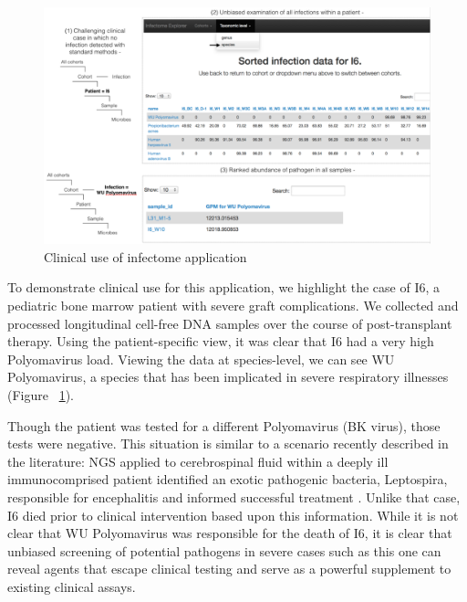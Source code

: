 \begin{figure}
\center\includegraphics[width=150mm,scale=0.5]{Figures/Fig8}
\caption{Clinical use of infectome application}
\label{fig:Fig8}
\end{figure}

To demonstrate clinical use for this application, we highlight the case of I6, a pediatric bone marrow patient with severe graft complications. We collected and processed longitudinal cell-free DNA samples over the course of post-transplant therapy. Using the patient-specific view, it was clear that I6 had a very high Polyomavirus load. Viewing the data at species-level, we can see WU Polyomavirus, a species that has been implicated in severe respiratory illnesses \cite{Kleines:2009gj} (Figure ~\ref{fig:Fig8}). 

Though the patient was tested for a different Polyomavirus (BK virus), those tests were negative. This situation is similar to a scenario recently described in the literature: NGS applied to cerebrospinal fluid within a deeply ill immunocomprised patient identified an exotic pathogenic bacteria, Leptospira, responsible for encephalitis and informed successful treatment \cite{Wilson:2014dv}. Unlike that case, I6 died prior to clinical intervention based upon this information. While it is not clear that WU Polyomavirus was responsible for the death of I6, it is clear that unbiased screening of potential pathogens in severe cases such as this one can reveal agents that escape clinical testing and serve as a powerful supplement to existing clinical assays.


